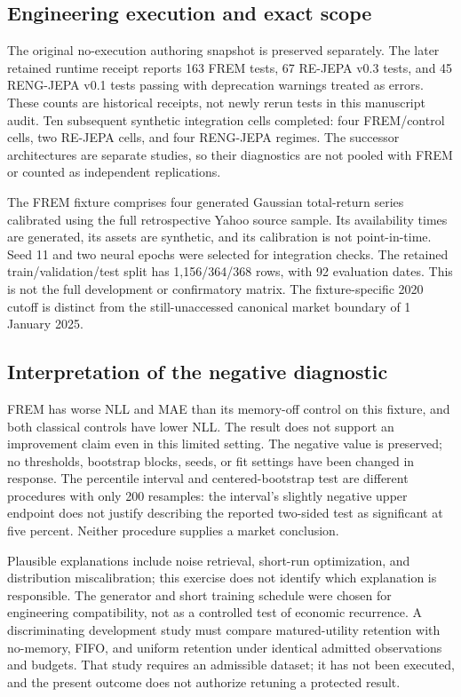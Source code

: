 \documentclass[11pt,a4paper]{article}
\begin{document}
\subsection{Engineering execution and exact scope}
The original no-execution authoring snapshot is preserved separately. The later retained runtime receipt reports 163 FREM tests, 67 RE-JEPA v0.3 tests, and 45 RENG-JEPA v0.1 tests passing with deprecation warnings treated as errors. These counts are historical receipts, not newly rerun tests in this manuscript audit. Ten subsequent synthetic integration cells completed: four FREM/control cells, two RE-JEPA cells, and four RENG-JEPA regimes. The successor architectures are separate studies, so their diagnostics are not pooled with FREM or counted as independent replications.

The FREM fixture comprises four generated Gaussian total-return series calibrated using the full retrospective Yahoo source sample. Its availability times are generated, its assets are synthetic, and its calibration is not point-in-time. Seed 11 and two neural epochs were selected for integration checks. The retained train/validation/test split has 1,156/364/368 rows, with 92 evaluation dates. This is not the full development or confirmatory matrix. The fixture-specific 2020 cutoff is distinct from the still-unaccessed canonical market boundary of 1 January 2025.



\subsection{Interpretation of the negative diagnostic}
FREM has worse NLL and MAE than its memory-off control on this fixture, and both classical controls have lower NLL. The result does not support an improvement claim even in this limited setting. The negative value is preserved; no thresholds, bootstrap blocks, seeds, or fit settings have been changed in response. The percentile interval and centered-bootstrap test are different procedures with only 200 resamples: the interval's slightly negative upper endpoint does not justify describing the reported two-sided test as significant at five percent. Neither procedure supplies a market conclusion.

Plausible explanations include noise retrieval, short-run optimization, and distribution miscalibration; this exercise does not identify which explanation is responsible. The generator and short training schedule were chosen for engineering compatibility, not as a controlled test of economic recurrence. A discriminating development study must compare matured-utility retention with no-memory, FIFO, and uniform retention under identical admitted observations and budgets. That study requires an admissible dataset; it has not been executed, and the present outcome does not authorize retuning a protected result.
\end{document}
